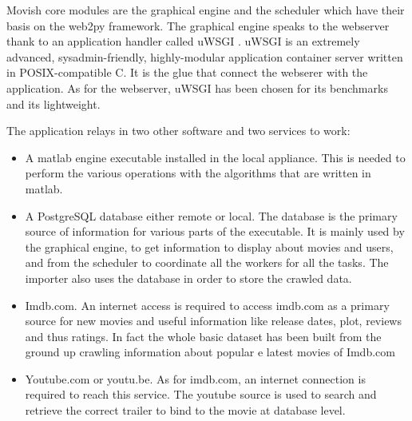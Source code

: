 Movish core modules are the graphical engine and the scheduler which have their basis on the web2py \cite{web2py} framework. The graphical engine speaks to the webserver thank to an application handler called uWSGI \cite{uwsgi}. uWSGI is an extremely advanced, sysadmin-friendly, highly-modular application container server written in POSIX-compatible C. It is the glue that connect the webserer with the application. As for the webserver, uWSGI has been chosen for its benchmarks and its lightweight.

The application relays in two other software and two services to work:
\begin{itemize}
\item A matlab \cite{matlab} engine executable installed in the local appliance. This is needed to perform the various operations with the algorithms that are written in matlab.
\item A PostgreSQL \cite{postgresql} database either remote or local. The database is the primary source of information for various parts of the executable. It is mainly used by the graphical engine, to get information to display about movies and users, and from the scheduler to coordinate all the workers for all the tasks. The importer also uses the database in order to store the crawled data.
\item Imdb.com. An internet access is required to access imdb.com as a primary source for new movies and useful information like release dates, plot, reviews and thus ratings. In fact the whole basic dataset has been built from the ground up crawling information about popular e latest movies of Imdb.com
\item Youtube.com or youtu.be. As for imdb.com, an internet connection is required to reach this service. The youtube source is used to search and retrieve the correct trailer to bind to the movie at database level.
\end{itemize}

